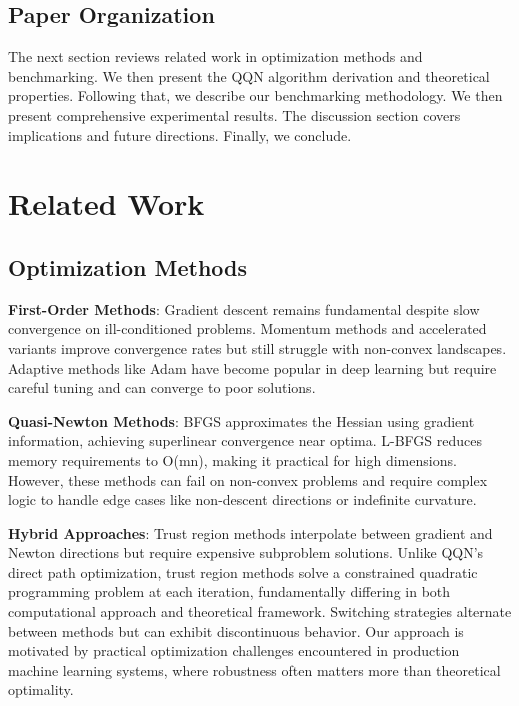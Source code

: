\hypertarget{paper-organization}{%
\subsection{Paper Organization}\label{paper-organization}}

The next section reviews related work in optimization methods and benchmarking.
We then present the QQN algorithm derivation and theoretical properties.
Following that, we describe our benchmarking methodology.
We then present comprehensive experimental results.
The discussion section covers implications and future directions.
Finally, we conclude.

\hypertarget{related-work}{%
\section{Related Work}\label{related-work}}

\hypertarget{optimization-methods}{%
\subsection{Optimization Methods}\label{optimization-methods}}

\textbf{First-Order Methods}: Gradient descent \citep{cauchy1847methode} remains fundamental despite slow convergence on ill-conditioned problems.
Momentum methods \citep{polyak1964some} and accelerated variants \citep{nesterov1983method} improve convergence rates but still struggle with non-convex landscapes.
Adaptive methods like Adam \citep{kingma2015adam} have become popular in deep learning but require careful tuning and can converge to poor solutions.

\textbf{Quasi-Newton Methods}: BFGS \citep{broyden1970convergence, fletcher1970new, goldfarb1970family, shanno1970conditioning} approximates the Hessian using gradient information, achieving superlinear convergence near optima.
L-BFGS \citep{liu1989limited} reduces memory requirements to O(mn), making it practical for high dimensions.
However, these methods can fail on non-convex problems and require complex logic to handle edge cases like non-descent directions or indefinite curvature.

\textbf{Hybrid Approaches}: Trust region methods \citep{more1983computing} interpolate between gradient and Newton directions but require expensive subproblem solutions.
Unlike QQN's direct path optimization, trust region methods solve a constrained quadratic programming problem at each iteration, fundamentally differing in both computational approach and theoretical framework.
Switching strategies \citep{morales2000automatic} alternate between methods but can exhibit discontinuous behavior.
Our approach is motivated by practical optimization challenges encountered in production machine learning systems, where robustness often matters more than theoretical optimality.


